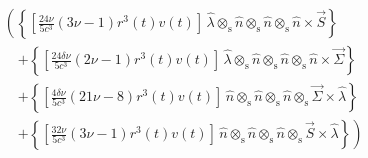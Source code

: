 \begin{align*}&\left( \left\{ \left[ \frac{24 \nu}{5 c^{3}} \left(3 \nu - 1\right) r^{3}{\left (t \right )} v{\left (t \right )} \right]\, \hat{\lambda} \otimes_{\mathrm{s}} \hat{n} \otimes_{\mathrm{s}} \hat{n} \otimes_{\mathrm{s}} \hat{n} \times \vec{S} \right\} \right. \nonumber \\&\quad \left. + \left\{ \left[ \frac{24 \delta \nu}{5 c^{3}} \left(2 \nu - 1\right) r^{3}{\left (t \right )} v{\left (t \right )} \right]\, \hat{\lambda} \otimes_{\mathrm{s}} \hat{n} \otimes_{\mathrm{s}} \hat{n} \otimes_{\mathrm{s}} \hat{n} \times \vec{\Sigma} \right\} \right. \nonumber \\&\quad \left. + \left\{ \left[ \frac{4 \delta \nu}{5 c^{3}} \left(21 \nu - 8\right) r^{3}{\left (t \right )} v{\left (t \right )} \right]\, \hat{n} \otimes_{\mathrm{s}} \hat{n} \otimes_{\mathrm{s}} \hat{n} \otimes_{\mathrm{s}} \vec{\Sigma} \times \hat{\lambda} \right\} \right. \nonumber \\&\quad \left. + \left\{ \left[ \frac{32 \nu}{5 c^{3}} \left(3 \nu - 1\right) r^{3}{\left (t \right )} v{\left (t \right )} \right]\, \hat{n} \otimes_{\mathrm{s}} \hat{n} \otimes_{\mathrm{s}} \hat{n} \otimes_{\mathrm{s}} \vec{S} \times \hat{\lambda} \right\} \right)\\\end{align*}